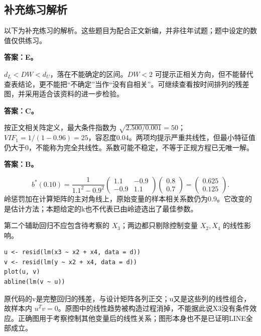 \clearpage\subsection*{补充练习解析}

以下为补充练习的解析。这些题目为配合正文新编，并非往年试题；题中设定的数值仅供练习。


\textbf{答案：E。}

\(d_L<DW<d_U\)，落在不能确定的区间。\(DW<2\) 可提示正相关方向，但不能替代查表结论，更不能把``不确定''当作``没有自相关''。可继续查看按时间排列的残差图，并采用适合该资料的进一步检验。





\textbf{答案：C。}

按正文相关阵定义，最大条件指数为 \(\sqrt{2.500/0.001}=50\)；\(VIF_1=1/(1-0.96)=25\)，容忍度0.04。两项均提示严重共线性，但最小特征值仍大于0，不能称为完全共线性。系数可能不稳定，不等于正规方程已无唯一解。





\textbf{答案：B。}

\[b^*(0.10)=\frac1{1.1^2-0.9^2}
\begin{pmatrix}1.1&-0.9\\-0.9&1.1\end{pmatrix}
\begin{pmatrix}0.8\\0.7\end{pmatrix}
=\begin{pmatrix}0.625\\0.125\end{pmatrix}.\] 岭惩罚加在计算矩阵的主对角线上，原始变量的样本相关系数仍为0.9。它改变的是估计方法；本题给定的k也不代表已由岭迹选出了最佳参数。





第二个辅助回归不应包含待考察的 \(X_3\)；两边都只剔除控制变量 \(X_2,X_4\) 的线性影响。

\begin{verbatim}
u <- resid(lm(x3 ~ x2 + x4, data = d))
v <- resid(lm(y ~ x2 + x4, data = d))
plot(u, v)
abline(lm(v ~ u))
\end{verbatim}

原代码的v是完整回归的残差，与设计矩阵各列正交；u又是这些列的线性组合，故样本内 \(u^Tv=0\)。原图中的线性趋势被构造过程消掉，不能据此说X3没有条件效应。正确图用于考察控制其他变量后的线性关系；图形本身也不是已证明LINE全部成立。




